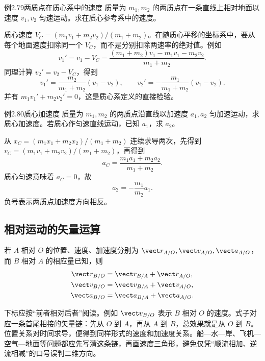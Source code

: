 \begin{origexamplebox}{例2.79\quad 两质点在质心系中的速度}
质量为 $m_1,m_2$ 的两质点在一条直线上相对地面以速度 $v_1,v_2$ 匀速运动。求在质心参考系中的速度。
\end{origexamplebox}
\begin{xesolution}
质心速度 $V_C=(m_1v_1+m_2v_2)/(m_1+m_2)$。在随质心平移的坐标系中，要从每个地面速度扣除同一个 $V_C$，而不是分别扣除两速率的绝对值。例如
\[
v_1'=v_1-V_C
=\frac{(m_1+m_2)v_1-m_1v_1-m_2v_2}{m_1+m_2}.
\]
同理计算 $v_2'=v_2-V_C$，得到
\[
\boxed{v_1'=\frac{m_2}{m_1+m_2}(v_1-v_2)},\qquad
\boxed{v_2'=-\frac{m_1}{m_1+m_2}(v_1-v_2)}.
\]
并有 $m_1v_1'+m_2v_2'=0$，这是质心系定义的直接检验。
\end{xesolution}

\begin{origexamplebox}{例2.80\quad 质心加速度}
质量为 $m_1,m_2$ 的两质点沿直线以加速度 $a_1,a_2$ 匀加速运动，求质心加速度。若质心作匀速直线运动，已知 $a_1$，求 $a_2$。
\end{origexamplebox}
\begin{xesolution}
从 $x_C=(m_1x_1+m_2x_2)/(m_1+m_2)$ 连续求导两次，先得到 $v_C=(m_1v_1+m_2v_2)/(m_1+m_2)$，再得到
\[
\boxed{a_C=\frac{m_1a_1+m_2a_2}{m_1+m_2}}.
\]
质心匀速意味着 $a_C=0$，故
\[
\boxed{a_2=-\frac{m_1}{m_2}a_1}.
\]
负号表示两质点加速度方向相反。
\end{xesolution}

\subsection*{相对运动的矢量运算}

若 $A$ 相对 $O$ 的位置、速度、加速度分别为 $\vect r_{A/O},\vect v_{A/O},\vect a_{A/O}$，而 $B$ 相对 $A$ 的相应量已知，则
\begin{align}
\vect r_{B/O}&=\vect r_{B/A}+\vect r_{A/O},\\
\vect v_{B/O}&=\vect v_{B/A}+\vect v_{A/O},\\
\vect a_{B/O}&=\vect a_{B/A}+\vect a_{A/O}.
\end{align}

\VelocityTriangleDiagram

下标应按“前者相对后者”阅读。例如 $\vect v_{B/O}$ 表示 $B$ 相对 $O$ 的速度。式子对应一条首尾相接的矢量链：先从 $O$ 到 $A$，再从 $A$ 到 $B$，总效果就是从 $O$ 到 $B$。位置关系对时间求导，便得到同样形式的速度和加速度关系。船—水—岸、飞机—空气—地面等问题都应先写清这条链，再画速度三角形，避免仅凭“顺流相加、逆流相减”的口号误判二维方向。

